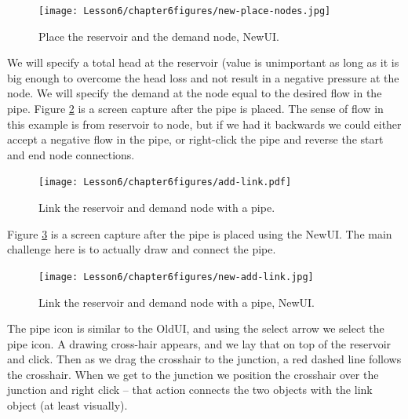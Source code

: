\begin{figure}[h!] %
   \centering
   \texttt{[image: Lesson6/chapter6figures/new-place-nodes.jpg]} 
   \caption{Place the reservoir and the demand node, NewUI.}
   \label{fig:new-place-nodes}
\end{figure}

We will specify a total head at the reservoir (value is unimportant as long as it is big enough to overcome the head loss and not result in a negative pressure at the node.   We will specify the demand at the node equal to the desired flow in the pipe.     Figure \ref{fig:add-link} is a screen capture after the pipe is placed.  The sense of flow in this example is from reservoir to node, but if we had it backwards we could either accept a negative flow in the pipe, or right-click the pipe and reverse the start and end node connections.

\begin{figure}[h!] %
   \centering
   \texttt{[image: Lesson6/chapter6figures/add-link.pdf]} 
   \caption{Link the reservoir and demand node with a pipe.}
   \label{fig:add-link}
\end{figure}

Figure \ref{fig:new-add-link} is a screen capture after the pipe is placed using the NewUI.
The main challenge here is to actually draw and connect the pipe.


\begin{figure}[h!] %
   \centering
   \texttt{[image: Lesson6/chapter6figures/new-add-link.jpg]} 
   \caption{Link the reservoir and demand node with a pipe, NewUI.}
   \label{fig:new-add-link}
\end{figure}
The pipe icon is similar to the OldUI, and using the select arrow we select the pipe icon.
A drawing cross-hair appears, and we lay that on top of the reservoir and click.
Then as we drag the crosshair to the junction, a red dashed line follows the crosshair.
When we get to the junction we position the crosshair over the junction and right click -- that action connects the two objects with the link object (at least visually).

